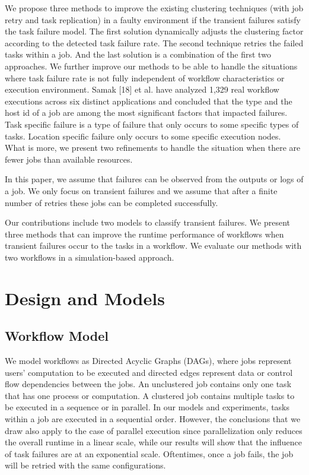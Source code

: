 \documentclass{IOS-Book-Article}
\begin{document}
We propose three methods to improve the existing clustering techniques (with job retry and task replication) in a faulty environment if the transient failures satisfy the task failure model. The first solution dynamically adjusts the clustering factor according to the detected task failure rate. The second technique retries the failed tasks within a job. And the last solution is a combination of the first two approaches. We further improve our methods to be able to handle the situations where task failure rate is not fully independent of workflow characteristics or execution environment. Samak [18] et al. have analyzed 1,329 real workflow executions across six distinct applications and concluded that the type and the host id of a job are among the most significant factors that impacted failures. Task specific failure is a type of failure that only occurs to some specific types of tasks. Location specific failure only occurs to some specific execution nodes. What is more, we present two refinements to handle the situation when there are fewer jobs than available resources. 

In this paper, we assume that failures can be observed from the outputs or logs of a job. We only focus on transient failures and we assume that after a finite number of retries these jobs can be completed successfully. 

Our contributions include two models to classify transient failures. We present three methods that can improve the runtime performance of workflows when transient failures occur to the tasks in a workflow. We evaluate our methods with two workflows in a simulation-based approach. 

\section{Design and Models}

\subsection{Workflow Model}

We model workflows as Directed Acyclic Graphs (DAGs), where jobs represent users’ computation to be executed and directed edges represent data or control flow dependencies between the jobs. An unclustered job contains only one task that has one process or computation. A clustered job contains multiple tasks to be executed in a sequence or in parallel. In our models and experiments, tasks within a job are executed in a sequential order. However, the conclusions that we draw also apply to the case of parallel execution since parallelization only reduces the overall runtime in a linear scale, while our results will show that the influence of task failures are at an exponential scale. Oftentimes, once a job fails, the job will be retried with the same configurations. 
\end{document}
